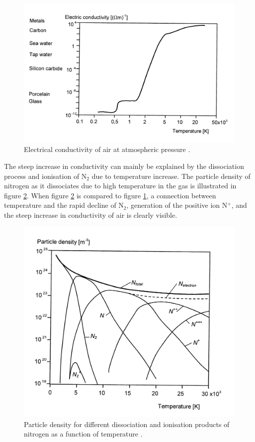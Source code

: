 \documentclass[10pt,b5paper,twoside]{article}
\begin{document}
\begin{figure}[H]
\centering
\includegraphics[scale=0.9]{Bilder/Theory/airConduct.png}
\caption{Electrical conductivity of air at atmospheric pressure \cite{bib:HVEbreak}.} \label{fig:condAir}
\end{figure}

The steep increase in conductivity can mainly be explained by the dissociation process and ionisation of N$_2$ due to temperature increase. The particle density of nitrogen as it dissociates due to high temperature in the gas is illustrated in figure \ref{fig:Ndensi}. When figure \ref{fig:Ndensi} is compared to figure \ref{fig:condAir}, a connection between temperature and the rapid decline of N$_2$, generation of the positive ion N$^+$, and the steep increase in conductivity of air is clearly visible.

\begin{figure}[H]
\centering
\includegraphics[scale=0.8]{Bilder/Theory/particleDensNit.png}
\caption{Particle density for different dissociation and ionisation products of nitrogen as a function of temperature \cite{bib:HVEbreak}.} \label{fig:Ndensi}
\end{figure}
\end{document}

